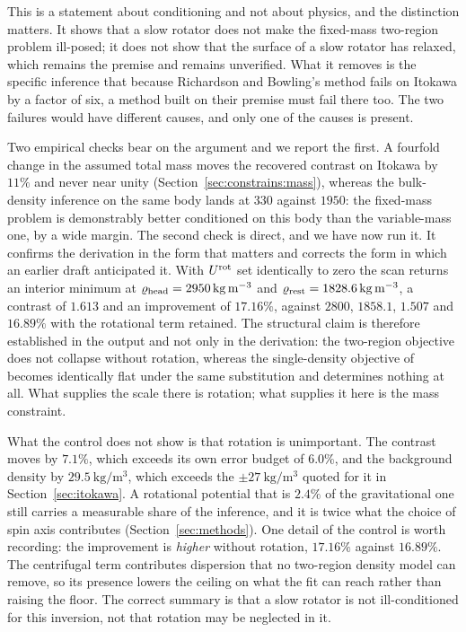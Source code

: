 This is a statement about conditioning and not about physics, and the
distinction matters. It shows that a slow rotator does not make the
fixed-mass two-region problem ill-posed; it does not show that the surface of
a slow rotator has relaxed, which remains the premise and remains unverified.
What it removes is the specific inference that because Richardson and
Bowling's method fails on Itokawa by a factor of six, a method built on their
premise must fail there too. The two failures would have different causes,
and only one of the causes is present.

Two empirical checks bear on the argument and we report the first. A
fourfold change in the assumed total mass moves the recovered contrast on
Itokawa by $11\%$ and never near unity
(Section~\ref{sec:constrains:mass}), whereas the bulk-density inference on
the same body lands at $330$ against $1950$: the fixed-mass problem is
demonstrably better conditioned on this body than the variable-mass one, by
a wide margin. The second check is direct, and we have now run it. It confirms the
derivation in the form that matters and corrects the form in which an earlier
draft anticipated it. With $U^{\mathrm{rot}}$ set identically to zero the scan returns
an interior minimum at
$\varrho_{\mathrm{head}} = \SI{2950}{\kilo\gram\per\cubic\metre}$ and
$\varrho_{\mathrm{rest}} = \SI{1828.6}{\kilo\gram\per\cubic\metre}$, a contrast of
$1.613$ and an improvement of $17.16\%$, against $2800$, $1858.1$, $1.507$
and $16.89\%$ with the rotational term retained. The structural claim is
therefore established in the output and not only in the derivation: the
two-region objective does not collapse without rotation, whereas the
single-density objective of \citet{richardson2014} becomes identically flat
under the same substitution and determines nothing at all. What supplies the
scale there is rotation; what supplies it here is the mass constraint.

What the control does not show is that rotation is unimportant. The contrast
moves by $7.1\%$, which exceeds its own error budget of $6.0\%$, and the
background density by $\SI{29.5}{\kilo\gram\per\cubic\metre}$, which
exceeds the $\pm\SI{27}{\kilo\gram\per\cubic\metre}$ quoted for it in
Section~\ref{sec:itokawa}. A rotational potential that is $2.4\%$ of the
gravitational one still carries a measurable share of the inference, and it
is twice what the choice of spin axis contributes
(Section~\ref{sec:methods}). One detail of the control is worth recording:
the improvement is \emph{higher} without rotation, $17.16\%$ against
$16.89\%$. The centrifugal term contributes dispersion that no two-region
density model can remove, so its presence lowers the ceiling on what the fit
can reach rather than raising the floor. The correct summary is that a slow
rotator is not ill-conditioned for this inversion, not that rotation may be
neglected in it.

